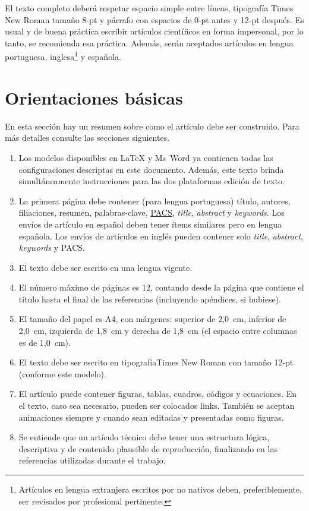 \documentclass[12pt, a4paper, twoside, twocolumn]{article}
\begin{document}
El texto completo deberá respetar espacio simple entre líneas, tipografía Times New Roman tamaño 8-pt y párrafo con espacios de 0-pt antes y 12-pt después. Es usual y de buena práctica escribir artículos científicos en forma impersonal, por lo tanto, se recomienda esa práctica. Además, serán aceptados artículos en lengua portuguesa, inglesa\footnote{Artículos en lengua extranjera escritos por no nativos deben, preferiblemente, ser revisados por profesional pertinente.} y española.


\section{Orientaciones básicas}


En esta sección hay un resumen sobre como el artículo debe ser construido. Para más detalles consulte las secciones siguientes.

\vspace{-8pt}
\begin{enumerate} \itemsep=2pt
    \item Los modelos disponibles en LaTeX y Ms~Word ya contienen todas las configuraciones descriptas en este documento. Además, este texto brinda simultáneamente instrucciones para las dos plataformas edición de texto.
	\item La primera página debe contener (para lengua portuguesa) título, autores, filiaciones, resumen, palabras-clave, \href{https://pubs.aip.org/DocumentLibrary/files/publications/jasa/Acoustics_PACS.pdf}{PACS}, \textit{title}, \textit{abstract} y \textit{keywords}. Los envíos de artículo en español deben tener ítems similares pero en lengua española. Los envíos de artículos en inglés pueden contener solo \textit{title}, \textit{abstract}, \textit{keywords} y PACS.
	\item El texto debe ser escrito en una lengua vigente.
	\item El número máximo de páginas es 12, contando desde la página que contiene el título hasta el final de las referencias (incluyendo apéndices, si hubiese).
	\item El tamaño del papel es A4, con márgenes: superior de 2,0~cm, inferior de 2,0~cm, izquierda de 1,8~cm y derecha de 1,8~cm (el espacio entre columnas es de 1,0~cm).
	\item El texto debe ser escrito en tipografía\linebreak Times New Roman con tamaño 12-pt (conforme este modelo).
	\item El artículo puede contener figuras, tablas, cuadros, códigos y ecuaciones. En el texto, caso sea necesario, pueden ser colocados links. También se aceptan animaciones siempre y cuando sean editadas y presentadas como figuras.
	\item Se entiende que un artículo técnico debe tener una estructura lógica, descriptiva y de contenido plausible de reproducción, finalizando en las referencias utilizadas durante el trabajo.
\end{enumerate}
\end{document}
